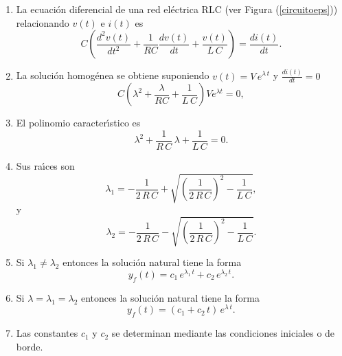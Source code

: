 \begin{enumerate}

\item La ecuaci\'{o}n diferencial de una red el\'{e}ctrica RLC 
(ver Figura (\ref{circuitoeps})) relacionando 
$v\left(t\right) $ e $i\left( t\right) $ es 
\begin{equation}
                C\left( \frac{d^{2} v\left( t\right) }{dt^{2}}+
                \frac{1}{RC}\frac{dv\left( t\right) }{dt}+
                \frac{v\left( t\right) }{L \, C} \right) =
        \frac{di\left( t\right) }{dt}.
\end{equation}

\item La soluci\'{o}n homog\'{e}nea se obtiene suponiendo $v(t) = V \, e^{\lambda \, t}$ y $\frac{di\left( t\right) }{dt} = 0$
\begin{equation}
        C\left( \lambda^{2} + \frac{\lambda}{RC} + \frac{1}{L \, C} \right) V e^{\lambda t} = 0,
\end{equation}

\item El polinomio caracter\'{\i}stico es 
\begin{equation}
        \lambda ^{2}+\frac{1}{R \, C} \, \lambda +\frac{1}{L \, C} = 0.
\end{equation}

\item Sus ra\'{\i}ces son 
\begin{equation}
        \lambda_{1}=-\frac{1}{2 \, R \, C}+\sqrt{\left( \frac{1}{2 \, R \, C}\right) ^{2}-\frac{1}{L \, C}},
\end{equation}
y 
\begin{equation}
        \lambda_{2}=-\frac{1}{2 \, R \, C}-\sqrt{\left( \frac{1}{2 \, R \, C}\right) ^{2}-\frac{1}{L \, C}}.
\end{equation}

\item Si $\lambda_{1} \neq \lambda_{2}$ entonces la soluci\'{o}n natural tiene la forma
\begin{equation}
        y_{f}\left( t\right) = c_{1} \, e^{\lambda_{1} \, t} + c_{2} \, e^{\lambda_{2} \, t}.
\end{equation}

\item Si $\lambda = \lambda_{1} = \lambda_{2}$ entonces la soluci\'{o}n natural tiene la forma
\begin{equation}
        y_{f}\left( t\right) = (c_{1} + c_{2} \, t) \, e^{\lambda \, t}.
\end{equation}

\item Las constantes $c_{1}$ y $c_{2}$ se determinan mediante las condiciones iniciales o de borde.

\end{enumerate}

